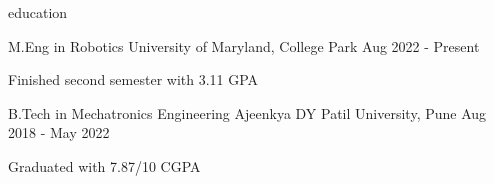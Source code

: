 \begin{section}{education}

  \begin{school}
    {M.Eng in Robotics}
    {University of Maryland, College Park}
    {Aug 2022 - Present}
    
    \item Finished second semester with 3.11 GPA

  \end{school}

  \begin{school}
    {B.Tech in Mechatronics Engineering}
    {Ajeenkya DY Patil University, Pune}
    {Aug 2018 - May 2022}

    \item Graduated with 7.87/10 CGPA

  \end{school}

\end{section}